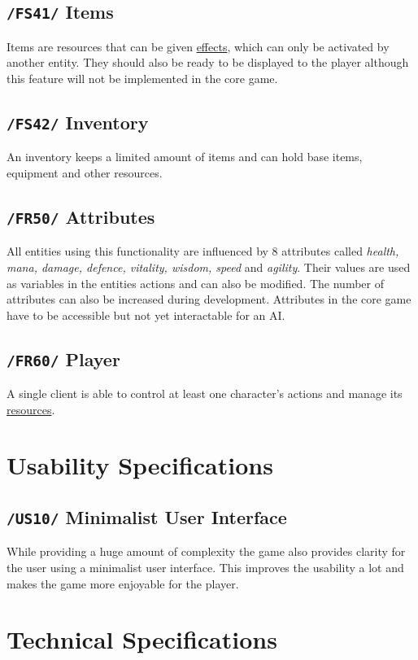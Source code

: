 \documentclass[11pt]{article}
\begin{document}
\subsection{\texttt{/FS41/} Items}\label{subsec:fs41items}
Items are resources that can be given \hyperref[subsec:fs30effects]{effects}, which can only be activated by another entity. 
They should also be ready to be displayed to the player although this feature will not be implemented in the core game.
\subsection{\texttt{/FS42/} Inventory}\label{subsec:fs42inventory}
An inventory keeps a limited amount of items and can hold base items, equipment and other resources.
\subsection{\texttt{/FR50/} Attributes}\label{subsec:fs50attributes}
All entities using this functionality are influenced by 8 attributes called \textit{health, mana, damage, defence, vitality, wisdom, speed} and \textit{agility}. 
Their values are used as variables in the entities actions and can also be modified. The number of attributes can also be increased during development.
Attributes in the core game have to be accessible but not yet interactable for an AI.
\subsection{\texttt{/FR60/} Player}\label{subsec:fs60player}
A single client is able to control at least one character's actions and manage its \hyperref[subsec:fs40resources]{resources}.

\section{Usability Specifications}\label{sec:us}
\subsection{\texttt{/US10/} Minimalist User Interface}
While providing a huge amount of complexity the game also provides clarity for the user using a minimalist user interface. This improves the usability a lot and makes the game more enjoyable for the player.

\section{Technical Specifications}\label{sec:ts}
\end{document}
